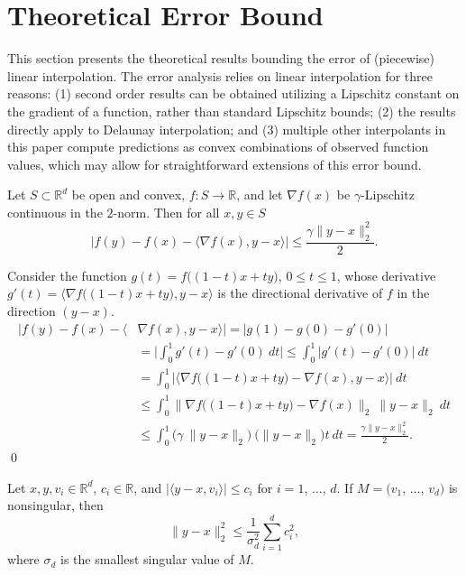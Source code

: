 \documentclass[smallextended,final]{svjour3}  %
\begin{document}
\section{Theoretical Error Bound}
\label{sec:theory}

This section presents the theoretical results bounding the error of
(piecewise) linear interpolation. The error analysis relies on linear
interpolation for three reasons: (1) second order results can be
obtained utilizing a Lipschitz constant on the gradient of a function,
rather than standard Lipschitz bounds; (2) the results directly apply
to Delaunay interpolation; and (3) multiple other interpolants in this
paper compute predictions as convex combinations of observed function
values, which may allow for straightforward extensions of this error
bound.

\begin{plainlemma}
  \label{lemma:1}
  Let $S \subset \mathbb{R}^d$ be open and convex, $f: S \rightarrow
  \mathbb{R}$, and let $\nabla f(x)$ be $\gamma$-Lipschitz continuous
  in the $2$-norm. Then for all $x,y \in S$
  $$\big|f(y) - f(x) - \langle \nabla f(x), y - x \rangle \big| \leq \frac{\gamma \|y - x\|_2^2}{2}.$$
\end{plainlemma}

\begin{proofdot}
  Consider the function $g(t) = f \big((1-t) x + t y \big)$, $0 \leq t
  \leq 1$, whose derivative $g'(t) = \big\langle \nabla f \big((1-t) x
  + t y \big), y - x \big\rangle$ is the directional derivative of $f$
  in the direction $(y - x).$
  \begin{align*}
    \big|f(y) - f(x) - \langle &\nabla f(x), y - x \rangle \big|
        = \big|g(1) - g(0) - g'(0) \big| \\
       &= \bigg| \int_0^1 g'(t) - g'(0)\ dt \bigg| \leq \int_0^1 \big|g'(t) - g'(0)\big|\ dt \\
       &= \int_0^1 \bigg| \big \langle \nabla f\big((1-t)x + ty\big) - \nabla f(x), y - x \big \rangle \bigg|\ dt \\
       &\leq \int_0^1 \big \| \nabla f\big((1-t)x + ty\big) - \nabla f(x) \big \|_2\ \| y - x \|_2\ dt \\
       &\leq \int_0^1 \big ( \gamma\ \|y-x\|_2 \big) \ \big( \|y-x\|_2 \big) t\ dt = \frac{\gamma \|y - x\|_2^2}{2}.
  \end{align*}
  \qed
\end{proofdot}

\hfill

\begin{plainlemma}
  \label{lemma:2}
  Let $x, y, v_i \in \mathbb{R}^d$, $c_i \in \mathbb{R}$, and
  $|\langle y - x, v_i \rangle| \leq c_i$ for $i = 1$, $\ldots$, $d.$
  If $M = (v_1$, $\ldots$, $v_d)$ is nonsingular, then
  $$\|y - x\|_2^2 \leq \frac{1}{\sigma_d^2} \sum_{i=1}^d c_i^2,$$
  where $\sigma_d$ is the smallest singular value of $M.$
\end{plainlemma}
\end{document}
